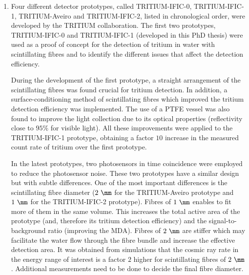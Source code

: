\begin{enumerate}

\item{} Four different detector prototypes, called TRITIUM-IFIC-0, TRITIUM-IFIC-1, TRITIUM-Aveiro and TRITIUM-IFIC-2, listed in chronological order, were developed by the TRITIUM collaboration. The first two prototypes, TRITIUM-IFIC-0 and TRITIUM-IFIC-1 (developed in this PhD thesis) were used as a proof of concept for the detection of tritium in water with scintillating fibres and to identify the different issues that affect the detection efficiency. %

During the development of the first prototype, a straight arrangement of the scintillating fibres was found crucial for tritium detection. In addition, a surface-conditioning method of scintillating fibres which improved the tritium detection efficiency was implemented. The use of a PTFE vessel was also found to improve the light collection due to its optical properties (reflectivity close to $95\%$ for visible light). All these improvements were applied to the TRITIUM-IFIC-1 prototype, obtaining a factor $10$ increase in the measured count rate of tritium over the first prototype. %

In the latest prototypes, two photosensors in time coincidence were employed to reduce the photosensor noise. These two prototypes have a similar design but with subtle differences. One of the most important differences is the scintillating fibre diameter ($2~\mm$ for the TRITIUM-Aveiro prototype and $1~\mm$ for the TRITIUM-IFIC-2 prototype). Fibres of $1~\mm$ enables to fit more of them in the same volume. This increases the total active area of the prototype (and, therefore its tritium detection efficiency) and the signal-to-background ratio (improving the MDA). Fibres of $2~\mm$ are stiffer which may facilitate the water flow through the fibre bundle and increase the effective detection area. It was obtained from simulations that the cosmic ray rate in the energy range of interest is a factor $2$ higher for scintillating fibres of $2~\mm$. Additional measurements need to be done to decide the final fibre diameter. %


\end{enumerate}
